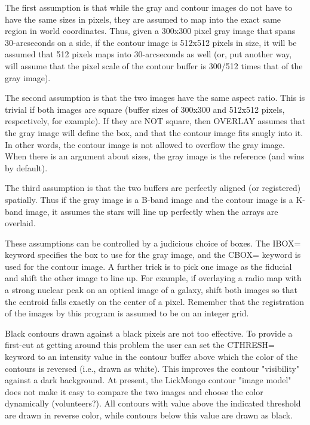The first assumption is that while the gray and contour images do not have
to have the same sizes in pixels, they are assumed to map into the exact
same region in world coordinates.  Thus, given a 300x300 pixel gray image
that spans 30-arcseconds on a side, if the contour image is 512x512 pixels
in size, it will be assumed that 512 pixels maps into 30-arcseconds as well
(or, put another way, will assume that the pixel scale of the contour
buffer is 300/512 times that of the gray image).

The second assumption is that the two images have the same aspect ratio.
This is trivial if both images are square (buffer sizes of 300x300 and
512x512 pixels, respectively, for example).  If they are NOT square, then
OVERLAY assumes that the gray image will define the box, and that the
contour image fits snugly into it.  In other words, the contour image is
not allowed to overflow the gray image.  When there is an argument about
sizes, the gray image is the reference (and wins by default).

The third assumption is that the two buffers are perfectly aligned (or
registered) spatially.  Thus if the gray image is a B-band image and the
contour image is a K-band image, it assumes the stars will line up
perfectly when the arrays are overlaid.

These assumptions can be controlled by a judicious choice of boxes.  The
IBOX= keyword specifies the box to use for the gray image, and the CBOX=
keyword is used for the contour image.  A further trick is to pick one
image as the fiducial and shift the other image to line up.  For example,
if overlaying a radio map with a strong nuclear peak on an optical image of
a galaxy, shift both images so that the centroid falls exactly on the
center of a pixel.  Remember that the registration of the images by this
program is assumed to be on an integer grid.

Black contours drawn against a black pixels are not too effective.  To
provide a first-cut at getting around this problem the user can set the
CTHRESH= keyword to an intensity value in the contour buffer above which
the color of the contours is reversed (i.e., drawn as white).  This
improves the contour "visibility" against a dark background.  At present,
the LickMongo contour "image model" does not make it easy to compare the
two images and choose the color dynamically (volunteers?).  All contours
with value above the indicated threshold are drawn in reverse color, while
contours below this value are drawn as black.

